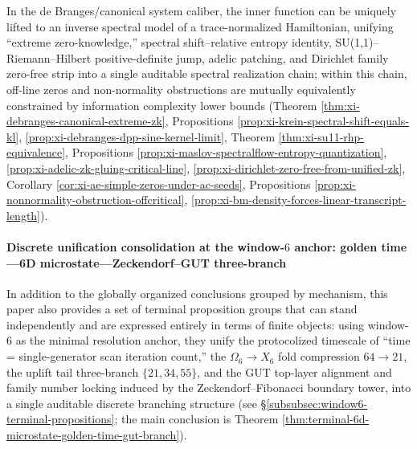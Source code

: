 In the de Branges/canonical system caliber, the inner function can be uniquely lifted to an inverse spectral model of a trace-normalized Hamiltonian, unifying ``extreme zero-knowledge,'' spectral shift--relative entropy identity, SU(1,1)--Riemann--Hilbert positive-definite jump, adelic patching, and Dirichlet family zero-free strip into a single auditable spectral realization chain; within this chain, off-line zeros and non-normality obstructions are mutually equivalently constrained by information complexity lower bounds (Theorem \ref{thm:xi-debranges-canonical-extreme-zk}, Propositions \ref{prop:xi-krein-spectral-shift-equals-kl}, \ref{prop:xi-debranges-dpp-sine-kernel-limit}, Theorem \ref{thm:xi-su11-rhp-equivalence}, Propositions \ref{prop:xi-maslov-spectralflow-entropy-quantization}, \ref{prop:xi-adelic-zk-gluing-critical-line}, \ref{prop:xi-dirichlet-zero-free-from-unified-zk}, Corollary \ref{cor:xi-ae-simple-zeros-under-ac-seeds}, Propositions \ref{prop:xi-nonnormality-obstruction-offcritical}, \ref{prop:xi-bm-density-forces-linear-transcript-length}).

\paragraph{Discrete unification consolidation at the window-\(6\) anchor: golden time---6D microstate---Zeckendorf--GUT three-branch}
In addition to the globally organized conclusions grouped by mechanism, this paper also provides a set of terminal proposition groups that can stand independently and are expressed entirely in terms of finite objects: using window-\(6\) as the minimal resolution anchor, they unify the protocolized timescale of ``time = single-generator scan iteration count,'' the \(\Omega_6\to X_6\) fold compression \(64\to 21\), the uplift tail three-branch \(\{21,34,55\}\), and the GUT top-layer alignment and family number locking induced by the Zeckendorf--Fibonacci boundary tower, into a single auditable discrete branching structure (see \S\ref{subsubsec:window6-terminal-propositions}; the main conclusion is Theorem \ref{thm:terminal-6d-microstate-golden-time-gut-branch}).

